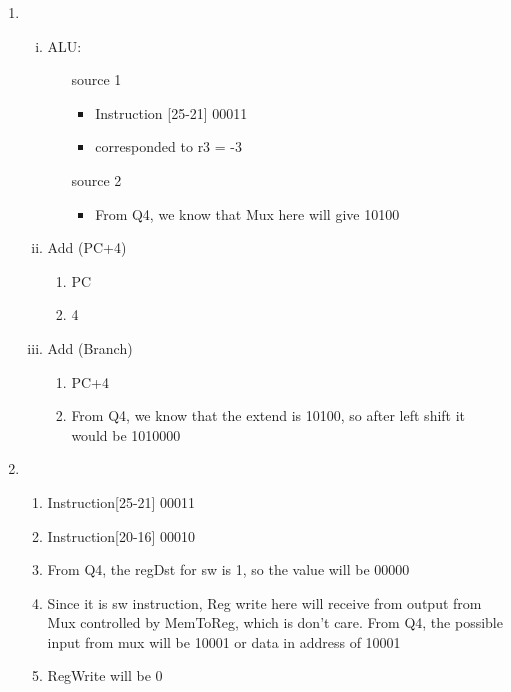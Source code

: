 \documentclass{article}
\begin{document}
\begin{enumerate}[1)]
    \item 
        \begin{enumerate}[i)]
            \item ALU: 
                \begin{enumerate}
                    \item [source 1]  
                        \begin{itemize}
                            \item Instruction [25-21] 00011
                            \item corresponded to r3 = -3
                        \end{itemize}
                    \item [source 2]
                        \begin{itemize}
                            \item From Q4, we know that Mux here will give 10100
                        \end{itemize}
                \end{enumerate}
            \item Add (PC+4)
                \begin{enumerate}
                    \item PC 
                    \item 4
                \end{enumerate}
            \item Add (Branch)
                \begin{enumerate}
                    \item PC+4
                    \item From Q4, we know that the extend is 10100, so after left shift it would be 1010000
                \end{enumerate}
        \end{enumerate}
    \item 
        \begin{enumerate}
            \item Instruction[25-21] 00011
            \item Instruction[20-16] 00010
            \item From Q4, the regDst for sw is 1, so the value will be 00000
            \item Since it is sw instruction, Reg write here will receive from output from Mux controlled by MemToReg, which is don't care. From Q4, the possible input from mux will be 10001 or data in address of 10001
            \item RegWrite will be 0
        \end{enumerate}
\end{enumerate}
\end{document}
